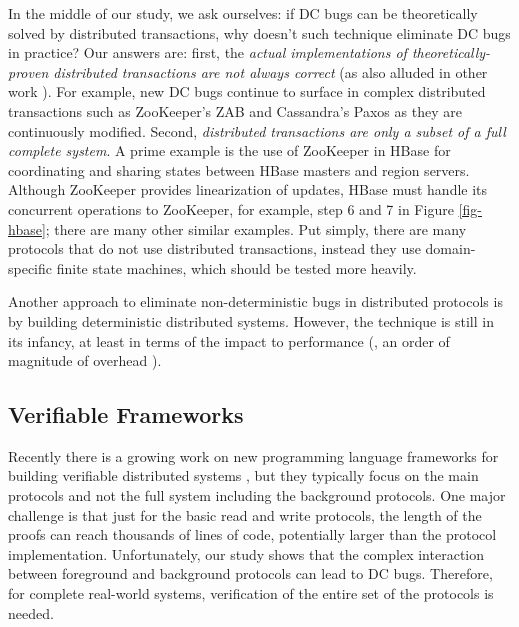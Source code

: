 In the middle of our study, we ask ourselves: if DC bugs can be
theoretically solved by distributed transactions, why doesn't such
technique eliminate DC bugs in practice?  Our answers are:
%
first, the {\em actual implementations of theoretically-proven
  distributed transactions are not always correct}
(as also alluded in other work \cite{Burrows06-Chubby, Ongaro+14-Raft}).
For example, new
DC bugs continue to surface in complex distributed transactions such
as ZooKeeper's ZAB and Cassandra's Paxos as they are continuously
modified.
%
Second, {\em distributed transactions are only a subset of a full
  complete system}.  A prime example is the use of ZooKeeper in HBase
for coordinating and sharing states between HBase masters and region
servers.  Although ZooKeeper provides linearization of updates, HBase
must handle its concurrent operations to ZooKeeper,
for example, step 6 and 7 in Figure \ref{fig-hbase};
there are many other similar examples.%
%
Put simply, there are many protocols that do not use distributed
transactions, instead they use domain-specific finite state machines,
which should be tested more heavily.

Another approach to eliminate non-deterministic bugs in distributed
protocols is by building deterministic distributed systems.  However, the
technique is still in its infancy, at least in terms of the impact to
performance (\eg, an order of magnitude of overhead \cite{Hunt+13-DDOS}).


\subsection{Verifiable Frameworks}
\label{less-others}

Recently there is a growing work on new programming language frameworks
for building verifiable distributed systems \cite{Desai+13-PLang,
Hawblitzel+15-IronFleet, Wilcox+15-Verdi}, but they typically focus on the
main protocols  and not the full system including
the background protocols.  One major challenge is that 
just for the basic read and write protocols,
the length of the
proofs can reach thousands of lines of code, potentially
larger than the protocol implementation.
Unfortunately, our study shows that the complex
interaction between foreground and background protocols can lead to DC
bugs.  Therefore, for complete real-world systems, verification of the
entire set of the protocols is needed.

